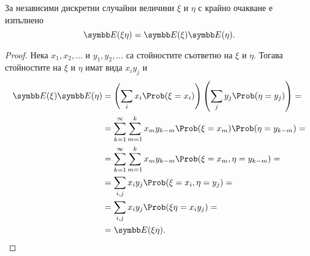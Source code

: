 \documentclass[numbers=endperiod, bibliography=totocnumbered]{scrartcl}
\begin{document}
\begin{proposition}\label{thm:expectation_of_independent_product}
  За независими дискретни случайни величини \( \xi \) и \( \eta \) с крайно очакване е изпълнено
  \begin{equation*}
    \Expect(\xi \eta) = \Expect(\xi) \Expect(\eta).
  \end{equation*}
\end{proposition}
\begin{proof}
  Нека \( x_1, x_2, \ldots \) и \( y_1, y_2, \ldots \) са стойностите съответно на \( \xi \) и \( \eta \). Тогава стойностите на \( \xi \) и \( \eta \) имат вида \( x_i y_j \) и
  \begin{align*}
    \Expect(\xi) \Expect(\eta)
    &=
    \left( \sum_i x_i \Prob(\xi = x_i) \right) \left( \sum_j y_j \Prob(\eta = y_j) \right)
    = \\ &=
    \sum_{k=1}^\infty \sum_{m=1}^k x_m y_{k-m} \Prob(\xi = x_m) \Prob(\eta = y_{k-m})
    = \\ &=
    \sum_{k=1}^\infty \sum_{m=1}^k x_m y_{k-m} \Prob(\xi = x_m, \eta = y_{k-m})
    = \\ &=
    \sum_{i, j} x_i y_j \Prob(\xi = x_i, \eta = y_j)
    = \\ &=
    \sum_{i, j} x_i y_j \Prob(\xi \eta = x_i y_j)
    = \\ &=
    \Expect(\xi \eta).
  \end{align*}
\end{proof}
\end{document}
